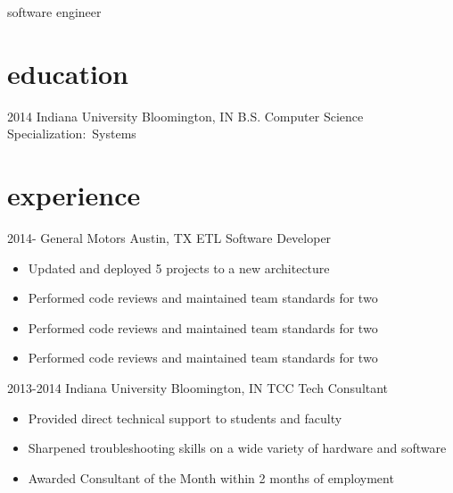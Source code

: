 \documentclass[]{friggeri-cv} %
\begin{document}
 
 
        {software engineer}





\section{education}

 \begin{entrylist}
  \entry
     {2014}
     {Indiana University}
     {Bloomington, IN}
     {B.S. Computer Science}
     {Specialization:~Systems}
    
 \end{entrylist}

 \section{experience}

 \begin{entrylist}
   \entry
     {2014-}
     {General Motors}
     {Austin, TX}
     {ETL Software Developer}
     {\begin{itemize}
         \item Updated and deployed 5 projects to a new architecture 
         \item Performed code reviews and maintained team standards for two
         \item Performed code reviews and maintained team standards for two
         \item Performed code reviews and maintained team standards for two

     \end{itemize}}
   \entry
     {2013-2014}
     {Indiana University}
     {Bloomington, IN}
     {TCC Tech Consultant}
     {\begin{itemize}
        \item Provided direct technical support to students and faculty
        \item Sharpened troubleshooting skills on a wide variety of hardware and software
        \item Awarded Consultant of the Month within 2 months of employment
     \end{itemize}
     }
 \end{entrylist}
\end{document}
